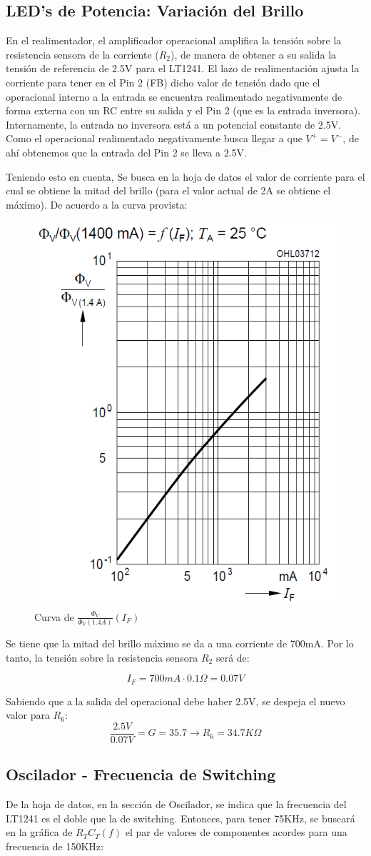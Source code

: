 \documentclass[e4_tp2_main.tex]{subfiles}
\begin{document}
\subsection*{LED's de Potencia: Variación del Brillo}
En el realimentador, el amplificador operacional amplifica la tensión sobre la resistencia sensora de la corriente ($R_2$), de manera de obtener a su salida la tensión de referencia de 2.5V para el LT1241. El lazo de realimentación ajusta la corriente para tener en el Pin 2 (FB) dicho valor de tensión dado que el operacional interno a la entrada se encuentra realimentado negativamente de forma externa con un RC entre su salida y el Pin 2 (que es la entrada inversora). Internamente, la entrada no inversora está a un potencial constante de 2.5V. Como el operacional realimentado negativamente busca llegar a que $V^+ = V^-$, de ahí obtenemos que la entrada del Pin 2 se lleva a 2.5V.\par
Teniendo esto en cuenta, Se busca en la hoja de datos el valor de corriente para el cual se obtiene la mitad del brillo (para el valor actual de 2A se obtiene el máximo). De acuerdo a la curva provista:

\begin{figure}[H]
\centering
\includegraphics[width=0.3\linewidth]{Imagenes/Punto2/Lumen-IF.png}
\caption{Curva de $\frac{\Phi_V}{\Phi_V(1.4A)}(I_F)$}
\end{figure}

Se tiene que la mitad del brillo máximo se da a una corriente 
de 700mA. Por lo tanto, la tensión sobre la resistencia sensora $R_2$ será de: 

\[
I_F = 700mA \cdot 0.1\Omega = 0.07V
\]

Sabiendo que a la salida del operacional debe haber 2.5V, se despeja el nuevo valor para $R_6$:
\[
\frac{2.5V}{0.07V} = G = 35.7 \longrightarrow R_6 = 34.7K \Omega
\]

\subsection*{Oscilador - Frecuencia de Switching}
De la hoja de datos, en la sección de Oscilador, se indica que la frecuencia del LT1241 es el doble que la de switching. Entonces, para tener 75KHz, se buscará en la gráfica de $R_TC_T(f)$ el par de valores de componentes acordes para una frecuencia de 150KHz:
\end{document}

